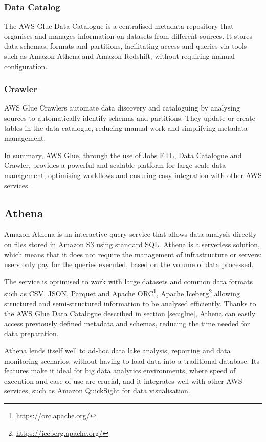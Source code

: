 \subsubsection{Data Catalog}
The \ac{AWS} Glue Data Catalogue is a centralised metadata repository that organises and manages information on datasets from different sources. It stores data schemas, formats and partitions, facilitating access and queries via tools such as Amazon Athena and Amazon Redshift, without requiring manual configuration.
\subsubsection{Crawler}
\ac{AWS} Glue Crawlers automate data discovery and cataloguing by analysing sources to automatically identify schemas and partitions. They update or create tables in the data catalogue, reducing manual work and simplifying metadata management.

In summary, \ac{AWS} Glue, through the use of Jobs \ac{ETL}, Data Catalogue and Crawler, provides a powerful and scalable platform for large-scale data management, optimising workflows and ensuring easy integration with other \ac{AWS} services.
\subsection{Athena}
Amazon Athena is an interactive query service that allows data analysis directly on files stored in Amazon \ac{S3} using standard \ac{SQL}. Athena is a serverless solution, which means that it does not require the management of infrastructure or servers: users only pay for the queries executed, based on the volume of data processed.

The service is optimised to work with large datasets and common data formats such as \ac{CSV}, \ac{JSON}, Parquet and Apache ORC\footnote{\url{https://orc.apache.org/}}, Apache Iceberg\footnote{\url{https://iceberg.apache.org/}} allowing structured and semi-structured information to be analysed efficiently. Thanks to the \ac{AWS} Glue Data Catalogue described in section \ref{sec:glue}, Athena can easily access previously defined metadata and schemas, reducing the time needed for data preparation.

Athena lends itself well to ad-hoc data lake analysis, reporting and data monitoring scenarios, without having to load data into a traditional database. Its features make it ideal for big data analytics environments, where speed of execution and ease of use are crucial, and it integrates well with other \ac{AWS} services, such as Amazon QuickSight for data visualisation.

